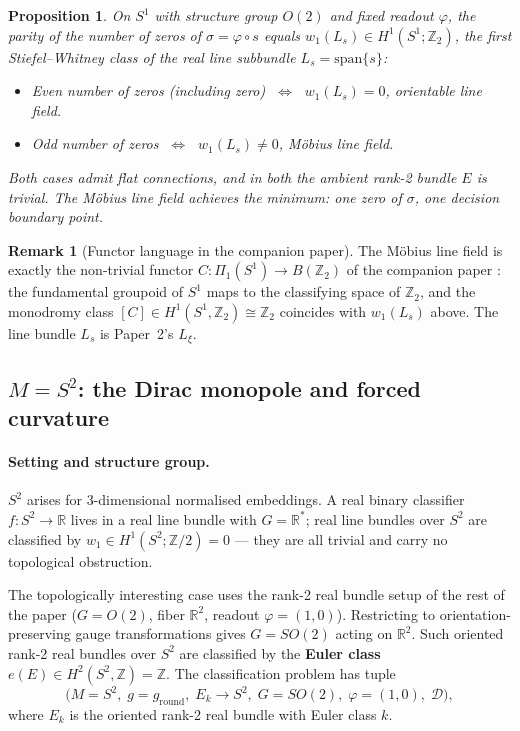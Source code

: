 \documentclass[11pt, a4paper]{article}
\theoremstyle{plain}
\newtheorem{proposition}[theorem]{Proposition}
\theoremstyle{definition}
\newtheorem{remark}[theorem]{Remark}
\newcommand{\R}{\mathbb{R}}
\begin{document}
\begin{proposition}\label{prop:s1-parity}
On $S^1$ with structure group $O(2)$ and fixed readout $\varphi$, the parity of
the number of zeros of $\sigma = \varphi \circ s$ equals
$w_1(L_s) \in H^1(S^1;\mathbb{Z}_2)$, the first Stiefel--Whitney class of the
real line subbundle $L_s = \mathrm{span}\{s\}$:
\begin{itemize}[itemsep=2pt]
  \item Even number of zeros (including zero) $\;\Leftrightarrow\;$
        $w_1(L_s) = 0$, orientable line field.
  \item Odd number of zeros $\;\Leftrightarrow\;$
        $w_1(L_s) \neq 0$, Möbius line field.
\end{itemize}
Both cases admit flat connections, and in both the ambient rank-2 bundle $E$ is
trivial. The Möbius line field achieves the minimum: one zero of $\sigma$, one
decision boundary point.
\end{proposition}

\begin{remark}[Functor language in the companion paper]
The Möbius line field is exactly the non-trivial functor
$C: \Pi_1(S^1) \to B(\mathbb{Z}_2)$ of the companion paper \cite{Vasii2026Paper2}:
the fundamental groupoid of $S^1$ maps to the classifying space of $\mathbb{Z}_2$,
and the monodromy class $[C] \in H^1(S^1, \mathbb{Z}_2) \cong \mathbb{Z}_2$
coincides with $w_1(L_s)$ above. The line bundle $L_s$ is Paper~2's $L_\xi$.
\end{remark}

\subsection{$M = S^2$: the Dirac monopole and forced curvature}

\paragraph{Setting and structure group.}
$S^2$ arises for 3-dimensional normalised embeddings. A real binary classifier
$f: S^2 \to \R$ lives in a real line bundle with $G = \R^*$; real line bundles
over $S^2$ are classified by $w_1 \in H^1(S^2;\mathbb{Z}/2) = 0$ — they are all
trivial and carry no topological obstruction.

The topologically interesting case uses the rank-2 real bundle setup of the rest
of the paper ($G = O(2)$, fiber $\R^2$, readout $\varphi = (1,0)$). Restricting
to orientation-preserving gauge transformations gives $G = SO(2)$
acting on $\R^2$. Such oriented rank-2 real bundles over $S^2$ are classified by
the \textbf{Euler class} $e(E) \in H^2(S^2,\mathbb{Z}) = \mathbb{Z}$. The
classification problem has tuple
\[
  \bigl(M = S^2,\; g = g_{\mathrm{round}},\; E_k \to S^2,\;
        G = SO(2),\; \varphi = (1,0),\; \mathcal{D}\bigr),
\]
where $E_k$ is the oriented rank-2 real bundle with Euler class $k$.
\end{document}
